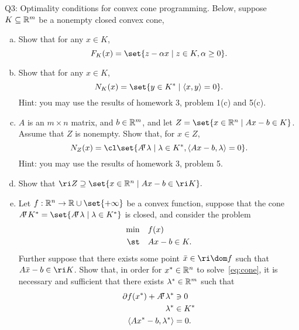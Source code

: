 \documentclass{article}
\begin{document}
\begin{problem}
    {Q3: Optimality conditions for convex cone programming.}
    Below, suppose $K\subseteq\mathbb{R}^m$ be a nonempty closed convex cone,
    \begin{enumerate}[(a)]
        \item Show that for any $x\in K$, \[F_K(x)=\set{z-\alpha x\mid z\in K, \alpha\geq 0}.\]
        \item Show that for any $x\in K$, \[N_K(x)=\set{y\in K^*\mid \angles*{x,y}=0}.\]
        Hint: you may use the results of homework 3, problem 1(c) and 5(c).
        \item  $A$ is an $m\times n$ matrix, and $b\in\mathbb{R}^m$, and let $Z=\set{x\in\R^n\mid Ax-b\in K}$. Assume that $Z$ is nonempty. Show that, for $x\in Z$, \[N_Z(x)=\cl\set{A\trn\lambda\mid\lambda\in K^*,\angles{Ax-b,\lambda}=0}.\]
        Hint: you may use the results of homework 3, problem 5.
        \item Show that $\ri Z \supseteq\set{x\in\R^n\mid Ax-b\in\ri K}.$
        \item Let $f:\R^n\rightarrow\R\cup\set{+\infty}$ be a convex function, suppose that the cone $A\trn K^*=\set{A\trn\lambda\mid\lambda\in K^*}$ is closed, and consider the problem{
            \begin{equation}
                \begin{aligned}
                    \min & \quad f(x) \\
                    \st & \quad Ax-b\in K.
                \end{aligned}
                \label{eq:cone}
            \end{equation}
        }
        Further suppose that there exists some point $\bar{x}\in\ri\dom f$ such that $A\bar{x}-b\in\ri K$. Show that, in order for $x^*\in\mathbb{R}^n$ to solve~\cref{eq:cone}, it is necessary and sufficient that there exists $\lambda^*\in \mathbb{R}^m$ such that
        \begin{align*}
            \partial f(x^*)+A{}^{\mkern-4mu\intercal}\lambda^* &\ni 0 \\
            \lambda^* & \in K^* \\
            \langle Ax^*-b,\lambda^*\rangle & =0.
        \end{align*}
    \end{enumerate}
\end{problem}
\end{document}
